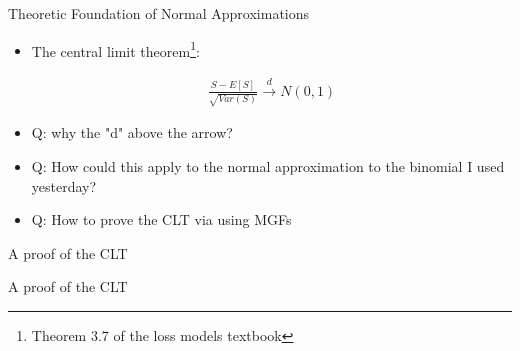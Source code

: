 \documentclass[11pt]{beamer}
\begin{document}
\begin{frame}{Theoretic Foundation of Normal Approximations}

\begin{itemize}
   \item The central limit theorem\footnote{Theorem 3.7 of the loss models textbook}: 
   
   \begin{eqnarray*}
   \frac{S-E[S]}{\sqrt{Var(S)}} \stackrel{d}\longrightarrow N (0, 1)
   \end{eqnarray*}
   
   \item Q: why the "d" above the arrow?
   
   \item Q: How could this apply to the normal approximation to the binomial I used yesterday?
  
   \item Q: How to prove the CLT via using MGFs

\end{itemize}
  
\end{frame}
\begin{frame}{A proof of the CLT}

\end{frame}
\begin{frame}{A proof of the CLT}

\end{frame}
\end{document}
